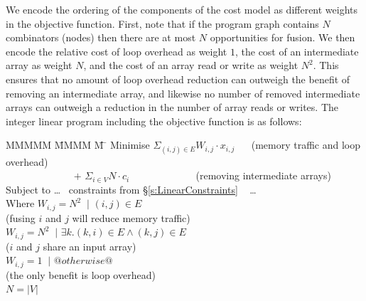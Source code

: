 We encode the ordering of the components of the cost model as different weights in the objective function. First, note that if the program graph contains $N$ combinators (nodes) then there are at most $N$ opportunities for fusion. We then encode the relative cost of loop overhead as weight $1$, the cost of an intermediate array as weight $N$, and the cost of an array read or write as weight $N^2$. This ensures that no amount of loop overhead reduction can outweigh the benefit of removing an intermediate array, and likewise no number of removed intermediate arrays can outweigh a reduction in the number of array reads or writes. The integer linear program including the objective function is as follows:
\begin{tabbing}
MMMMM   \= MMMM \= M \= \kill
Minimise   \>     $\Sigma_{(i,j) \in E} W_{i,j} \cdot x_{i,j}$   
                        ~~ (memory traffic and loop overhead)
\\ ~~~~~~~~~~~~~ $+$ \> $\Sigma_{i \in V} N \cdot c_i$
                        ~~~~~~~~~~~~ (removing intermediate arrays)
\\[1ex]
   Subject to  \> \ldots ~ constraints from \S\ref{s:LinearConstraints} ~ \ldots 
\\ Where   \> $W_{i,j} = N^2$ \> $~|$ \> $(i,j) \in E $         
\\         \> \> \> (fusing $i$ and $j$ will reduce memory traffic)         
\\         \> $W_{i,j} = N^2$ \> $~|$ \> $\exists k. (k,i) \in E \wedge (k,j) \in E $     
\\         \> \> \> ($i$ and $j$ share an input array)
\\         \> $W_{i,j} = 1$   \> $~|$ \> $@otherwise@$
\\         \> \> \> (the only benefit is loop overhead)
\\         \> $N = |V|$
\end{tabbing}




